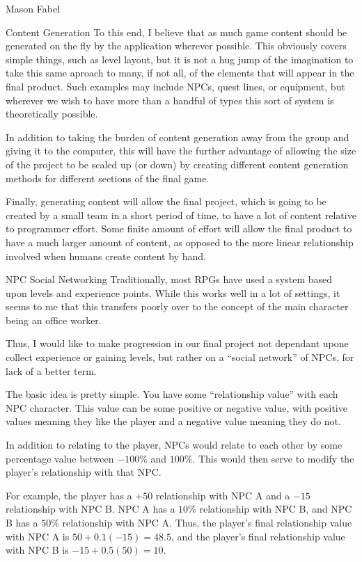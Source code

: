 \documentclass[12pt]{report}
\begin{document}
\begin{section}{Mason Fabel}
\begin{subsection}{Content Generation}
To this end, I believe that as much game content should be generated on the
fly by the application wherever possible. This obviously covers simple
things, such as level layout, but it is not a hug jump of the imagination
to take this same aproach to many, if not all, of the elements that will
appear in the final product. Such examples may include NPCs, quest lines, or
equipment, but wherever we wish to have more than a handful of types this
sort of system is theoretically possible.

In addition to taking the burden of content generation away from the group
and giving it to the computer, this will have the further advantage of
allowing the size of the project to be scaled up (or down) by creating
different content generation methods for different sections of the final
game.

Finally, generating content will allow the final project, which is going to
be created by a small team in a short period of time, to have a lot of
content relative to programmer effort. Some finite amount of effort will
allow the final product to have a much larger amount of content, as
opposed to the more linear relationship involved when humans create
content by hand.
\end{subsection}

\begin{subsection}{NPC Social Networking}
Traditionally, most RPGs have used a system based upon levels and
experience points. While this works well in a lot of settings, it seems to
me that this transfers poorly over to the concept of the main character
being an office worker.

Thus, I would like to make progression in our final project not dependant
upone collect experience or gaining levels, but rather on a ``social
network'' of NPCs, for lack of a better term.

The basic idea is pretty simple. You have some ``relationship value''
with each NPC character. This value can be some positive or negative value,
with positive values meaning they like the player and a negative value
meaning they do not.

In addition to relating to the player, NPCs would relate to each other by
some percentage value between $-100\%$ and $100\%$. This would then serve
to modify the player's relationship with that NPC.

For example, the player has a $+50$ relationship with NPC A and a $-15$
relationship with NPC B. NPC A has a $10\%$ relationship with NPC B, and
NPC B has a $50\%$ relationship with NPC A. Thus, the player's final
relationship value with NPC A is $50+0.1(-15)=48.5$, and the player's
final relationship value with NPC B is $-15+0.5(50)=10$.


\end{subsection}
\end{section}
\end{document}
